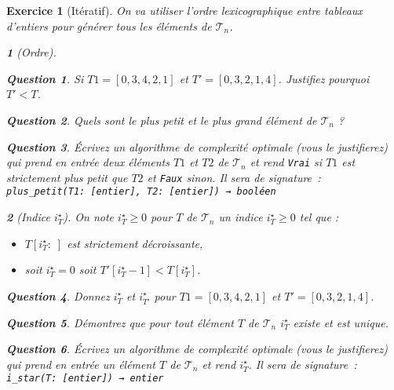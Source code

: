 \documentclass{article}
\theoremstyle{exostyle}
\newtheorem{exo}{Exercice}
\theoremstyle{partiestyle}
\newtheorem{partie}{}[exo]
\theoremstyle{questionstyle}
\newtheorem{questionpartie}{Question}[partie]
\begin{document}
\begin{exo}[Itératif]
    On va utiliser l'ordre lexicographique entre tableaux d'entiers pour générer tous les éléments de $\mathcal{T}_n$. 
    \begin{partie}[Ordre]
        \begin{questionpartie}
            Si $T1 = [0, 3, 4, 2, 1]$ et $T' = [0, 3, 2, 1 ,4]$. Justifiez pourquoi $T' < T$.
        \end{questionpartie}
        \begin{questionpartie}
            Quels sont le plus petit et le plus grand élément de $\mathcal{T}_n$ ?
        \end{questionpartie}
        \begin{questionpartie}
            Écrivez un algorithme de complexité optimale (vous le justifierez) qui prend en entrée deux éléments $T1$ et $T2$ de $\mathcal{T}_n$ et rend \verb|Vrai| si $T1$ est strictement plus petit que $T2$ et \verb|Faux| sinon. Il sera de signature~:
              \verb|plus_petit(T1: [entier], T2: [entier]) → booléen| 
        \end{questionpartie}
    \end{partie}
    \begin{partie}[Indice $i^\star_{T}$]
        On note $i^\star_{T}\geq 0$ pour $T$ de $\mathcal{T}_n$ un indice $i^\star_{T}\geq 0$ tel que :
        \begin{itemize}
            \item $T[i^\star_{T}:\;]$ est strictement décroissante,
            \item soit $i^\star_{T}=0$ soit $T'[i^\star_{T}-1] < T[i^\star_{T}]$.
        \end{itemize}
        \begin{questionpartie}
            Donnez $i^\star_{T}$ et $i^\star_{T'}$ pour $T1 = [0, 3, 4, 2, 1]$ et $T' = [0, 3, 2, 1 ,4]$.
        \end{questionpartie}
        \begin{questionpartie}
            Démontrez que pour tout élément $T$ de $\mathcal{T}_n$ $i^\star_{T}$ existe et est unique.
        \end{questionpartie}
        \begin{questionpartie}
            Écrivez un algorithme de complexité optimale (vous le justifierez) qui prend en entrée un élément $T$ de $\mathcal{T}_n$ et rend $i^\star_{T}$. Il sera de signature~:
              \verb|i_star(T: [entier]) → entier| 
        \end{questionpartie}

\end{partie}
\end{exo}
\end{document}
